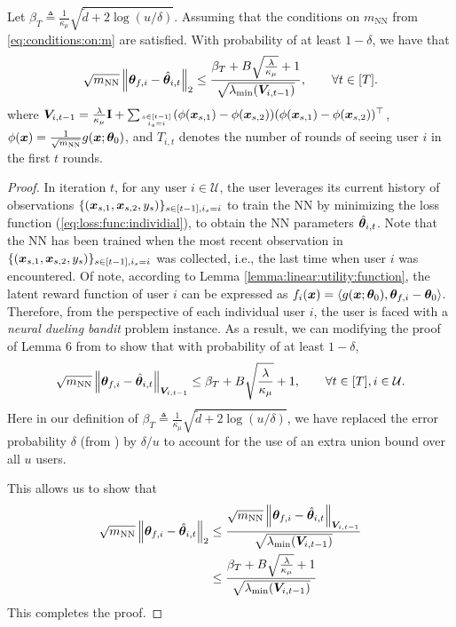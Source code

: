 \begin{lemma}
\label{lemma:conf:ellip:neural}
Let $\beta_T \triangleq \frac{1}{\kappa_\mu} \sqrt{ \widetilde{d} + 2\log(u/\delta)}$.
Assuming that the conditions on $m_{\text{NN}}$ from \cref{eq:conditions:on:m} are satisfied.
With probability of at least $1-\delta$, we have that
\[
	\sqrt{m_{\text{NN}}} \left\| \boldsymbol{\theta}_{f,i} - \hat{\boldsymbol{\theta}}_{i,t} \right\|_{2} \leq  \frac{\beta_T + B \sqrt{\frac{\lambda}{\kappa_\mu}} + 1}{\sqrt{\lambda_{\min}(\boldsymbol{V}_{i,t-1})}}, \qquad \forall t\in[T].
\]
where $\boldsymbol{V}_{i,t-1}=\frac{\lambda}{\kappa_\mu} \mathbf{I}+\sum_{s\in[t-1]\atop i_s=i}(\phi(\boldsymbol{x}_{s,1}) - \phi(\boldsymbol{x}_{s,2}))(\phi(\boldsymbol{x}_{s,1}) - \phi(\boldsymbol{x}_{s,2}))^\top$, $\phi(\boldsymbol{x}) = \frac{1}{\sqrt{m_{\text{NN}}}} g(\boldsymbol{x};\boldsymbol{\theta}_0)$, and $T_{i,t}$ denotes the number of rounds of seeing user $i$ in the first $t$ rounds.
\end{lemma}
\begin{proof}
In iteration $t$, for any user $i\in\mathcal{U}$, the user leverages its current history of observations $\{(\boldsymbol{x}_{s,1}, \boldsymbol{x}_{s,2}, y_s)\}_{s\in[t-1], i_s = i}$ to train the NN by minimizing the loss function (\eqref{eq:loss:func:individial}), to obtain the NN parameters $\hat{\boldsymbol{\theta}}_{i,t}$.
Note that the NN has been trained when the most recent observation in $\{(\boldsymbol{x}_{s,1}, \boldsymbol{x}_{s,2}, y_s)\}_{s\in[t-1], i_s = i}$ was collected, i.e., the last time when user $i$ was encountered.
Of note, according to Lemma \ref{lemma:linear:utility:function}, the latent reward function of user $i$ can be expressed as $f_i(\boldsymbol{x}) = \langle g(\boldsymbol{x};\boldsymbol{\theta}_0), \boldsymbol{\theta}_{f,i} - \boldsymbol{\theta}_0 \rangle$.
Therefore, from the perspective of each individual user $i$, the user is faced with a \emph{neural dueling bandit} problem instance.
As a result, we can modifying the proof of Lemma 6 from \citet{verma2024neural} to show that
with probability of at least $1-\delta$,
\[
	\sqrt{m_{\text{NN}}} \left\| \boldsymbol{\theta}_{f,i} - \hat{\boldsymbol{\theta}}_{i,t} \right\|_{\boldsymbol{V}_{i,t-1}} \leq  \beta_T + B \sqrt{\frac{\lambda}{\kappa_\mu}} + 1, \qquad \forall t\in[T], i\in\mathcal{U}.
\]
Here in our definition of $\beta_T \triangleq \frac{1}{\kappa_\mu} \sqrt{ \widetilde{d} + 2\log(u/\delta)}$, we have replaced the error probability $\delta$ (from \citet{verma2024neural}) by $\delta/u$ to account for the use of an extra union bound over all $u$ users.

This allows us to show that
\begin{equation}
\begin{split}
\sqrt{m_{\text{NN}}} \left\| \boldsymbol{\theta}_{f,i} - \hat{\boldsymbol{\theta}}_{i,t} \right\|_2 &\leq \frac{\sqrt{m_{\text{NN}}} \left\| \boldsymbol{\theta}_{f,i} - \hat{\boldsymbol{\theta}}_{i,t} \right\|_{\boldsymbol{V}_{i,t-1}}}{\sqrt{\lambda_{\min}(\boldsymbol{V}_{i,t-1})}}\\
&\leq \frac{\beta_T + B \sqrt{\frac{\lambda}{\kappa_\mu}} + 1}{\sqrt{\lambda_{\min}(\boldsymbol{V}_{i,t-1})}}
\end{split}
\end{equation}
This completes the proof.
\end{proof}


